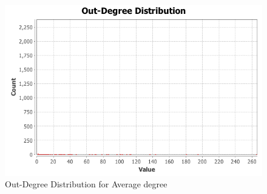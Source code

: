 \begin{figure}[ht]    
    \begin{center}
        \includegraphics[scale=0.60]{q3/AverageDegree/outdegree-distribution.png}
        \caption{Out-Degree Distribution for Average 
        degree}
        \label{fig:q3-9}
    \end{center}
\end{figure}
\newpage

